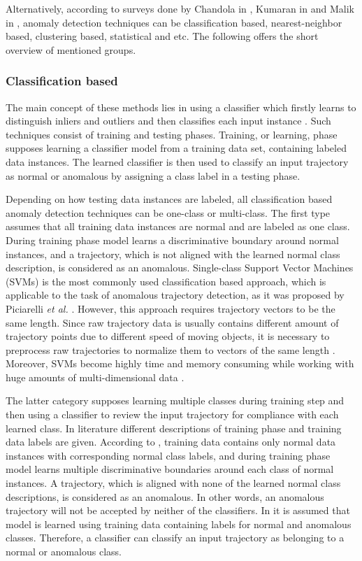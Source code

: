Alternatively, according to surveys done by Chandola in \cite{article:15_survey_ad}, Kumaran in \cite{article:6_survey_anom_det_rtuvs} and Malik in \cite{article:comp_analys_odt}, anomaly detection techniques can be classification based, nearest-neighbor based, clustering based, statistical and etc. The following offers the short overview of mentioned groups.

\subsubsection{Classification based}
The main concept of these methods lies in using a classifier which firstly learns to distinguish inliers and outliers and then classifies each input instance \cite{inproceedings:18_ardod_lstd}. Such techniques consist of training and testing phases. Training, or learning, phase supposes learning a classifier model from a training data set, containing labeled data instances. The learned classifier is then used to classify an input trajectory as normal or anomalous by assigning a class label in a testing phase.

Depending on how testing data instances are labeled, all classification based anomaly detection techniques can be one-class or multi-class. The first type assumes that all training data instances are normal and are labeled as one class. During training phase model learns a discriminative boundary around normal instances, and a trajectory, which is not aligned with the learned normal class description, is considered as an anomalous. Single-class Support Vector Machines (SVMs) is the most commonly used classification based approach, which is applicable to the task of anomalous trajectory detection, as it was proposed by Piciarelli \textit{et al.} \cite{inproceedings:16_va_tad_svm}\cite{article:17_tbaed}. However, this approach requires trajectory vectors to be the same length. Since raw trajectory data is usually contains different amount of trajectory points due to different speed of moving objects, it is necessary to preprocess raw trajectories to normalize them to vectors of the same length \cite{article:17_tbaed}. Moreover, SVMs become highly time and memory consuming while working with huge amounts of multi-dimensional data \cite{article:22_survey_dscc}.

The latter category supposes learning multiple classes during training step and then using a classifier to review the input trajectory for compliance with each learned class. In literature different descriptions of training phase and training data labels are given. According to \cite{article:15_survey_ad}, training data contains only normal data instances with corresponding normal class labels, and during training phase model learns multiple discriminative boundaries around each class of normal instances. A trajectory, which is aligned with none of the learned normal class descriptions, is considered as an anomalous. In other words, an anomalous trajectory will not be accepted by neither of the classifiers. In \cite{article:6_survey_anom_det_rtuvs} it is assumed that model is learned using training data containing labels for normal and anomalous classes. Therefore, a classifier can classify an input trajectory as belonging to a normal or anomalous class.

